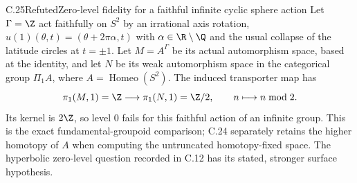 \begin{claim}{C.25}{Refuted}{Zero-level fidelity for a faithful infinite cyclic sphere action}
Let $\Gamma=\Z$ act faithfully on $S^2$ by an irrational axis rotation,
$u(1)(\theta,t)=(\theta+2\pi\alpha,t)$ with
$\alpha\in\R\setminus\Q$ and the usual collapse of the latitude
circles at $t=\pm1$. Let $M=A^\Gamma$ be its actual automorphism
space, based at the identity, and let $N$ be its weak automorphism
space in the categorical group $\Pi_1A$, where
$A=\operatorname{Homeo}(S^2)$. The induced transporter map has
\[
 \pi_1(M,1)=\Z\longrightarrow\pi_1(N,1)=\Z/2,
 \qquad n\longmapsto n\bmod2.
\]
Its kernel is $2\Z$, so level $0$ fails for this faithful action of an
infinite group. This is the exact fundamental-groupoid comparison;
C.24 separately retains the higher homotopy of $A$ when computing the
untruncated homotopy-fixed space. The hyperbolic zero-level question
recorded in C.12 has its stated, stronger surface hypothesis.
\end{claim}
